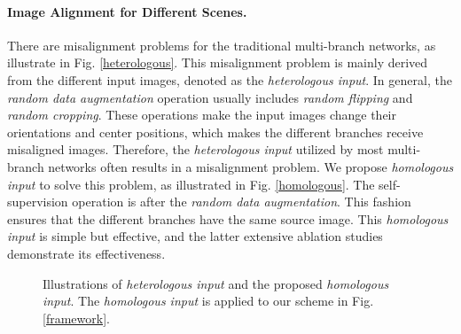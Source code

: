 \documentclass[a4paper]{cas-dc}
\begin{document}
\paragraph{Image Alignment for Different Scenes.} There are misalignment problems for the traditional multi-branch networks, as illustrate in Fig. \ref{heterologous}. This misalignment problem is mainly derived from the different input images, denoted as the \textit{heterologous input}. In general, the \textit{random data augmentation} operation usually includes \textit{random flipping} and \textit{random cropping}. These operations make the input images change their orientations and center positions, which makes the different branches receive misaligned images. Therefore, the \textit{heterologous input} utilized by most multi-branch networks often results in a misalignment problem. We propose \textit{homologous input} to solve this problem, as illustrated in Fig. \ref{homologous}. The self-supervision operation is after the \textit{random data augmentation}. This fashion ensures that the different branches have the same source image. This \textit{homologous input} is simple but effective, and the latter extensive ablation studies demonstrate its effectiveness.

\begin{figure}[!h]
	\centering
	\caption{Illustrations of \textit{heterologous input} and the proposed \textit{homologous input}. The \textit{homologous input} is applied to our scheme in Fig. \ref{framework}.} \label{inputs}
\end{figure}
\end{document}
